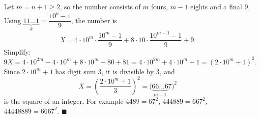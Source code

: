 Let $m=n+1\ge2$, so the number consists of $m$ fours, $m-1$ eights and a final $9$. Using $\underbrace{11\ldots1}_{k}=\dfrac{10^k-1}{9}$, the number is
\[
X=4\cdot10^{m}\cdot\dfrac{10^m-1}{9}+8\cdot10\cdot\dfrac{10^{m-1}-1}{9}+9 .
\]
Simplify:
\[
9X=4\cdot10^{2m}-4\cdot10^m+8\cdot10^m-80+81=4\cdot10^{2m}+4\cdot10^m+1=\left(2\cdot10^m+1\right)^2 .
\]
Since $2\cdot10^m+1$ has digit sum $3$, it is divisible by $3$, and
\[
X=\left(\dfrac{2\cdot10^m+1}{3}\right)^2=\big(\underbrace{66\ldots6}_{m-1}7\big)^2
\]
is the square of an integer. For example $4489=67^2$, $444889=667^2$, $44448889=6667^2$. $\blacksquare$
